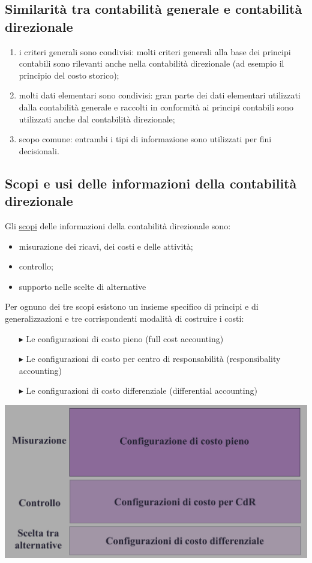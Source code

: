 \documentclass{article}
\begin{document}
\subsection{Similarità tra contabilità generale e contabilità direzionale}
\begin{enumerate}
    \item i criteri generali sono condivisi: molti criteri generali alla base dei principi contabili sono rilevanti anche nella contabilità direzionale (ad esempio il principio del costo storico);
    \item molti dati elementari sono condivisi: gran parte dei dati elementari utilizzati dalla contabilità generale e raccolti in conformità ai principi contabili sono utilizzati anche dal contabilità direzionale;
    \item scopo comune: entrambi i tipi di informazione sono utilizzati per fini decisionali.
\end{enumerate}



\subsection{Scopi e usi delle informazioni della contabilità direzionale}
Gli \underline{scopi} delle informazioni della contabilità direzionale sono:
\begin{itemize}
    \item misurazione dei ricavi, dei costi e delle attività;
    \item controllo;
    \item supporto nelle scelte di alternative
\end{itemize}
Per ognuno dei tre scopi esistono un insieme specifico di principi e di generalizzazioni e tre corrispondenti modalità di costruire i costi:
\begin{itemize}
    \item[$\blacktriangleright$] Le configurazioni di costo pieno (full cost accounting)
    \item[$\blacktriangleright$] Le configurazioni di costo per centro di responsabilità (responsibality accounting)
    \item[$\blacktriangleright$] Le configurazioni di costo differenziale (differential accounting)
\end{itemize}
\begin{center}
    \includegraphics[scale=0.3]{Image/ScopiContDirez_1.png}
\end{center}
\end{document}
